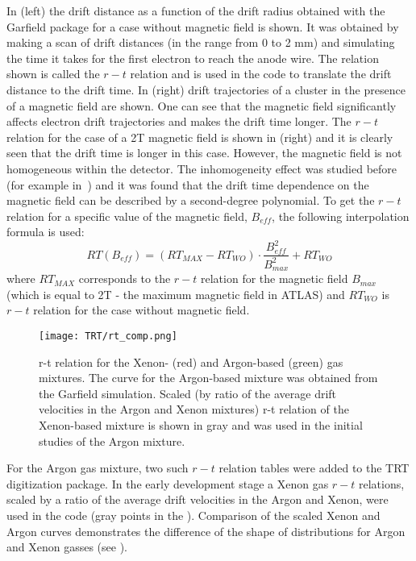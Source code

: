 In  (left) the drift distance as a function of the drift radius obtained with the Garfield package for a case without magnetic field is shown.
It was obtained by making a scan of drift distances (in the range from 0 to 2 mm) and simulating the time it takes for the first electron to reach the anode wire.
The relation shown is called the $r-t$ relation and is used in the code to translate the drift distance to the drift time.
In  (right) drift trajectories of a cluster in the presence of a magnetic field are shown. One can see that the magnetic field
significantly affects electron drift trajectories and makes the drift time longer. The $r-t$ relation for the case of a 2T magnetic field is shown
in  (right) and it is clearly seen that the drift time is longer in this case. However, the magnetic field is not homogeneous within the detector.
The inhomogeneity effect was studied before (for example in~\cite{esben_thesis}) and it was found that the drift time dependence on the magnetic field can be described by a second-degree polynomial. 
To get the $r-t$ relation for a specific value of the magnetic field, $B_{eff}$, the following interpolation formula is used:
\begin{displaymath}
    RT(B_{eff}) = (RT_{MAX} - RT_{WO}) \cdot \dfrac{B_{eff}^2}{B_{max}^2} + RT_{WO}
\end{displaymath}
where $RT_{MAX}$ corresponds to the $r-t$ relation for the magnetic field $B_{max}$ (which is equal to 2T - the maximum magnetic field in ATLAS) and $RT_{WO}$ is 
$r-t$ relation for the case without magnetic field.

\begin{figure}
\centering
 \texttt{[image: TRT/rt\_comp.png]}
\caption{r-t relation for the Xenon- (red) and Argon-based (green) gas mixtures. The curve for the Argon-based mixture was obtained from the Garfield simulation. 
Scaled (by ratio of the average drift velocities in the Argon and Xenon mixtures) 
r-t relation of the Xenon-based mixture is shown in gray and was used in the initial studies of the Argon mixture.
}
\label{fig:rt_comp}
\end{figure}

For the Argon gas mixture, two such $r-t$ relation tables were added to the TRT digitization package.
In the early development stage a Xenon gas $r-t$ relations, scaled by a ratio of the average drift velocities in the Argon and Xenon, were used in the code 
(gray points in the ). 
Comparison of the scaled Xenon and Argon curves demonstrates the difference of the shape of distributions for Argon and Xenon gasses (see ).

